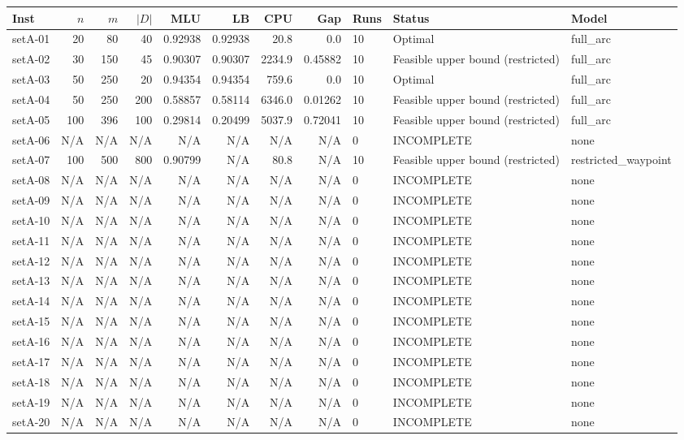 \begin{tabular}{lrrrrrrrlll}
\toprule
Inst & $n$ & $m$ & $|D|$ & MLU & LB & CPU & Gap & Runs & Status & Model \\ \midrule
setA-01 & 20 & 80 & 40 & 0.92938 & 0.92938 & 20.8 & 0.0 & 10 & Optimal & full\_arc \\
setA-02 & 30 & 150 & 45 & 0.90307 & 0.90307 & 2234.9 & 0.45882 & 10 & Feasible upper bound (restricted) & full\_arc \\
setA-03 & 50 & 250 & 20 & 0.94354 & 0.94354 & 759.6 & 0.0 & 10 & Optimal & full\_arc \\
setA-04 & 50 & 250 & 200 & 0.58857 & 0.58114 & 6346.0 & 0.01262 & 10 & Feasible upper bound (restricted) & full\_arc \\
setA-05 & 100 & 396 & 100 & 0.29814 & 0.20499 & 5037.9 & 0.72041 & 10 & Feasible upper bound (restricted) & full\_arc \\
setA-06 & N/A & N/A & N/A & N/A & N/A & N/A & N/A & 0 & INCOMPLETE & none \\
setA-07 & 100 & 500 & 800 & 0.90799 & N/A & 80.8 & N/A & 10 & Feasible upper bound (restricted) & restricted\_waypoint \\
setA-08 & N/A & N/A & N/A & N/A & N/A & N/A & N/A & 0 & INCOMPLETE & none \\
setA-09 & N/A & N/A & N/A & N/A & N/A & N/A & N/A & 0 & INCOMPLETE & none \\
setA-10 & N/A & N/A & N/A & N/A & N/A & N/A & N/A & 0 & INCOMPLETE & none \\
setA-11 & N/A & N/A & N/A & N/A & N/A & N/A & N/A & 0 & INCOMPLETE & none \\
setA-12 & N/A & N/A & N/A & N/A & N/A & N/A & N/A & 0 & INCOMPLETE & none \\
setA-13 & N/A & N/A & N/A & N/A & N/A & N/A & N/A & 0 & INCOMPLETE & none \\
setA-14 & N/A & N/A & N/A & N/A & N/A & N/A & N/A & 0 & INCOMPLETE & none \\
setA-15 & N/A & N/A & N/A & N/A & N/A & N/A & N/A & 0 & INCOMPLETE & none \\
setA-16 & N/A & N/A & N/A & N/A & N/A & N/A & N/A & 0 & INCOMPLETE & none \\
setA-17 & N/A & N/A & N/A & N/A & N/A & N/A & N/A & 0 & INCOMPLETE & none \\
setA-18 & N/A & N/A & N/A & N/A & N/A & N/A & N/A & 0 & INCOMPLETE & none \\
setA-19 & N/A & N/A & N/A & N/A & N/A & N/A & N/A & 0 & INCOMPLETE & none \\
setA-20 & N/A & N/A & N/A & N/A & N/A & N/A & N/A & 0 & INCOMPLETE & none \\
\bottomrule
\end{tabular}
